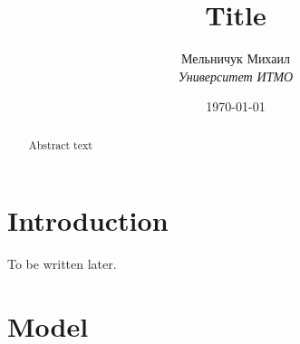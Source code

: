 \documentclass[12pt]{article}
\title{Title}
\author{
  Мельничук Михаил\\ {\itshape\large Университет ИТМО}
}
\date{\today}
\begin{document}
\maketitle
\begin{abstract}
  Abstract text

  \par\vspace{-2.5mm}
\end{abstract}

\newpage

\section{Introduction}

To be written later.

\section{Model}


\end{document}
